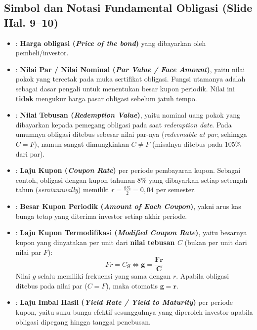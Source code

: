 \documentclass[11pt,a4paper]{article}
\begin{document}
\subsection{Simbol dan Notasi Fundamental Obligasi (Slide Hal. 9--10)}

\begin{definitionbox}
\begin{itemize}[leftmargin=2em, itemsep=0.4em]
    \item[$P$] : \textbf{Harga obligasi (\textit{Price of the bond})} yang dibayarkan oleh pembeli/investor.
    \item[$F$] : \textbf{Nilai Par / Nilai Nominal (\textit{Par Value / Face Amount})}, yaitu nilai pokok yang tercetak pada muka sertifikat obligasi. Fungsi utamanya adalah sebagai dasar pengali untuk menentukan besar kupon periodik. Nilai ini \textbf{tidak} mengukur harga pasar obligasi sebelum jatuh tempo.
    \item[$C$] : \textbf{Nilai Tebusan (\textit{Redemption Value})}, yaitu nominal uang pokok yang dibayarkan kepada pemegang obligasi pada saat \textit{redemption date}. Pada umumnya obligasi ditebus sebesar nilai par-nya (\textit{redeemable at par}, sehingga $C = F$), namun sangat dimungkinkan $C \neq F$ (misalnya ditebus pada $105\%$ dari par).
    \item[$r$] : \textbf{Laju Kupon (\textit{Coupon Rate})} per periode pembayaran kupon. Sebagai contoh, obligasi dengan kupon tahunan $8\%$ yang dibayarkan setiap setengah tahun (\textit{semiannually}) memiliki $r = \frac{8\%}{2} = 0{,}04$ per semester.
    \item[$Fr$] : \textbf{Besar Kupon Periodik (\textit{Amount of Each Coupon})}, yakni arus kas bunga tetap yang diterima investor setiap akhir periode.
    \item[$g$] : \textbf{Laju Kupon Termodifikasi (\textit{Modified Coupon Rate})}, yaitu besarnya kupon yang dinyatakan per unit dari \textbf{nilai tebusan $C$} (bukan per unit dari nilai par $F$):
    \begin{equation}
        Fr = Cg \iff \mathbf{g = \frac{Fr}{C}}
    \end{equation}
    Nilai $g$ selalu memiliki frekuensi yang sama dengan $r$. Apabila obligasi ditebus pada nilai par ($C = F$), maka otomatis $\mathbf{g = r}$.
    \item[$i$] : \textbf{Laju Imbal Hasil (\textit{Yield Rate / Yield to Maturity})} per periode kupon, yaitu suku bunga efektif sesungguhnya yang diperoleh investor apabila obligasi dipegang hingga tanggal penebusan.

\end{itemize}
\end{definitionbox}
\end{document}
